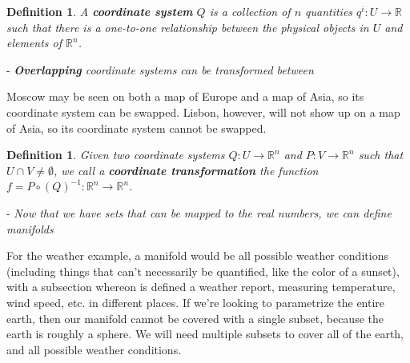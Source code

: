\documentclass{book}
\newtheorem{defn}[equation]{Definition}
\begin{document}
\begin{defn}
	A \textbf{coordinate system} $Q$ is a collection of $n$ quantities $q^i : U \to \mathbb{R}$ such that there is a one-to-one relationship between the physical objects in $U$ and elements of $\mathbb{R}^n$.
\end{defn}


- \emph{\textbf{Overlapping} coordinate systems can be transformed between}

Moscow may be seen on both a map of Europe and a map of Asia, so its coordinate system can be swapped. Lisbon, however, will not show up on a map of Asia, so its coordinate system cannot be swapped. 


\begin{defn}
	Given two coordinate systems  $Q : U \to \mathbb{R}^n$ and $P : V \to \mathbb{R}^n$ such that $U \cap V \neq \emptyset$, we call a \textbf{coordinate transformation} the function $f = P \circ (Q)^{-1} : \mathbb{R}^n \to \mathbb{R}^n$.
\end{defn}




- \emph{Now that we have sets that can be mapped to the real numbers, we can define manifolds}

For the weather example, a manifold would be all possible weather conditions (including things that can't necessarily be quantified, like the color of a sunset), with a subsection whereon is defined a weather report, measuring temperature, wind speed, etc. in different places. If we're looking to parametrize the entire earth, then our manifold cannot be covered with a single subset, because the earth is roughly a sphere. We will need multiple subsets to cover all of the earth, and all possible weather conditions. 
\end{document}
